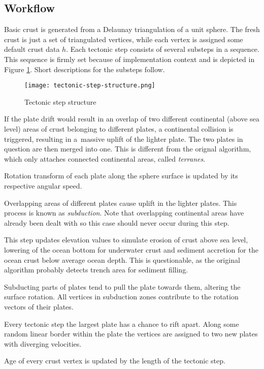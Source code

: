 \subsection{Workflow}
Basic crust is generated from a Delaunay triangulation of a unit sphere. The fresh crust is just a set of triangulated vertices, while each vertex is assigned some default crust data $h$. Each tectonic step consists of several substeps in a sequence. This sequence is firmly set because of implementation context and is depicted in Figure \ref{fig:tectonic-step-structure}. Short descriptions for the substeps follow.
\begin{figure}[ht]
\centering
\texttt{[image: tectonic-step-structure.png]}
\caption{Tectonic step structure}
\label{fig:tectonic-step-structure}
\end{figure}
\begin{itemize}[\label={}]
\item[\textbf{Continental collisions}] If the plate drift would result in an overlap of two different continental (above sea level) areas of crust belonging to different plates, a continental collision is triggered, resulting in a~massive uplift of the lighter plate. The two plates in question are then merged into one. This is different from the orignal algorithm, which only attaches connected continental areas, called \textit{terranes}.
\item[\textbf{Plate drift}] Rotation transform of each plate along the sphere surface is updated by its respective angular speed.
\item[\textbf{Subduction uplift}] Overlapping areas of different plates cause uplift in the lighter plates. This process is known as \textit{subduction}. Note that overlapping continental areas have already been dealt with so this case should never occur during this step.
\item[\textbf{Continental erosion, ocean damping, sediment accretion}] This step updates elevation values to simulate erosion of crust above sea level, lowering of the ocean bottom for underwater crust and sediment accretion for the ocean crust below average ocean depth. This is questionable, as the original algorithm probably detects trench area for sediment filling.
\item[\textbf{Slab pull}] Subducting parts of plates tend to pull the plate towards them, altering the surface rotation. All vertices in subduction zones contribute to the rotation vectors of their plates.
\item[\textbf{Plate rifting}] Every tectonic step the largest plate has a chance to rift apart. Along some random linear border within the plate the vertices are assigned to two new plates with diverging velocities.
\item[\textbf{Crust aging}] Age of every crust vertex is updated by the length of the tectonic step.
\end{itemize}
